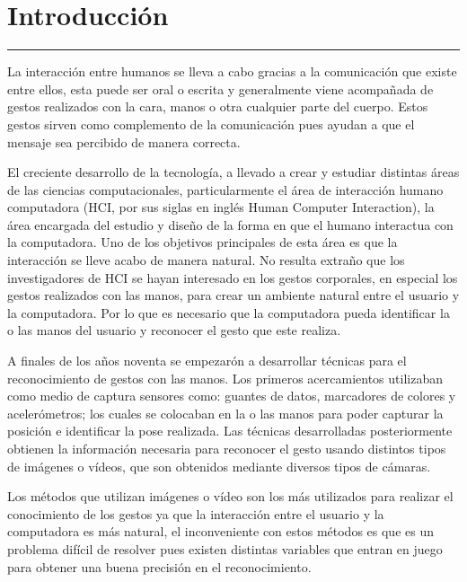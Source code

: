 \chapter{Introducci\'on}\label{capit:cap1}
\vspace{-2.0325ex}%
\noindent
\rule{\textwidth}{0.5pt}
\vspace{-5.5ex}%
\newcommand{\pushline}{\Indp}%

La interacción entre humanos se lleva a cabo gracias a la comunicación  que existe entre ellos, esta puede ser oral o escrita y generalmente viene acompañada de gestos realizados con la cara, manos o otra cualquier parte del cuerpo. 
Estos gestos sirven como complemento de la comunicación pues ayudan a que el mensaje sea percibido de manera correcta.

El creciente desarrollo de la tecnología, a llevado  a crear y estudiar distintas áreas de las ciencias computacionales, particularmente el área de interacción humano computadora (HCI, por sus siglas en ingl\'es Human Computer Interaction), la área encargada del estudio y diseño de la forma en que el humano interactua con la computadora. 
Uno de los objetivos principales de esta área es que la interacción se lleve acabo de manera natural. 
No resulta extraño que los investigadores de HCI se hayan interesado en los gestos corporales, en especial los gestos realizados con las manos, para crear un ambiente natural entre el usuario y la computadora.  
Por lo que es necesario que la computadora pueda identificar la o las manos del usuario y reconocer el gesto que este realiza. 

A finales de los años noventa se empezar\'on a desarrollar t\'ecnicas para  el reconocimiento de gestos con las manos. Los primeros acercamientos utilizaban como medio de captura sensores como: guantes de datos, marcadores de colores y acelerómetros; los cuales se colocaban en la o las manos para poder capturar la posición e identificar la pose realizada. 
Las técnicas desarrolladas posteriormente obtienen la información necesaria para reconocer el gesto usando distintos tipos de imágenes o vídeos, que son obtenidos mediante diversos tipos de cámaras.

Los métodos que utilizan imágenes o vídeo son los más utilizados para realizar el conocimiento de los gestos ya que la interacción entre el usuario y la computadora es más natural, el inconveniente con estos métodos es que es un problema difícil de resolver pues existen distintas variables que entran en juego para obtener una buena precisión en el reconocimiento. 

